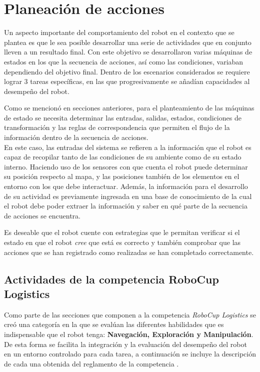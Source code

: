 \chapter{Planeación de acciones}
Un aspecto importante del comportamiento del robot en el contexto que se plantea es que le sea posible desarrollar una serie de actividades que en conjunto lleven a un resultado final.
Con este objetivo se desarrollaron varias máquinas de estados en los que la secuencia de acciones, así como las condiciones, variaban dependiendo del objetivo final. 
Dentro de los escenarios considerados se requiere lograr 3 tareas específicas, en las que progresivamente se añadían capacidades al desempeño del robot.

Como se mencionó en secciones anteriores, para el planteamiento de las máquinas de estado se necesita determinar las entradas, salidas, estados,  condiciones de transformación y las reglas de correspondencia que permiten el flujo de la información dentro de la secuencia de acciones.\\
En este caso, las entradas del sistema se refieren a la información que el robot es capaz de recopilar tanto de las condiciones de su ambiente como de su estado interno.
Haciendo uso de los sensores con que cuenta el robot puede determinar su posición respecto al mapa, y las posiciones también de los elementos en el entorno con los que debe interactuar.
Además, la información para el desarrollo de su actividad es previamente ingresada en una base de conocimiento de la cual el robot debe poder extraer la información y saber en qué parte de la secuencia de acciones se encuentra.

Es deseable que el robot cuente con estrategias que le permitan verificar si el estado en que el robot \textit{cree} que está es correcto y también comprobar que las acciones que se han registrado como realizadas se han completado correctamente.

\section{Actividades de la competencia RoboCup Logistics}
Como parte de las secciones que componen a la competencia \textit{RoboCup Logistics} se creó una categoría en la que se evalúan las diferentes habilidades que es indispensable que el robot tenga: \textbf{Navegación, Exploración y Manipulación}. De esta forma se facilita la integración y la evaluación del desempeño del robot en un entorno controlado para cada tarea, a continuación se incluye la descripción de cada una obtenida del reglamento de la competencia \cite{technical_committee_20122022_robocup_2022}.

